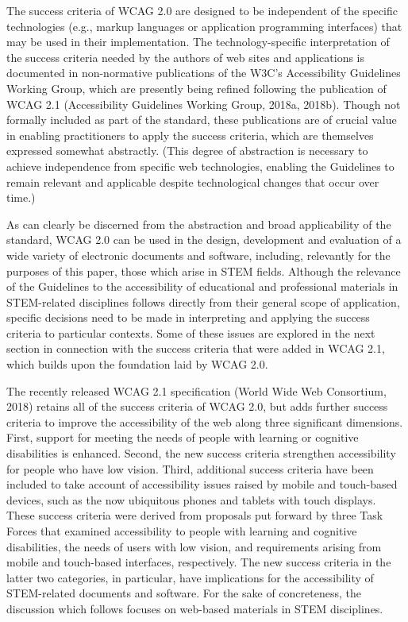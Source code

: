 \documentclass[11.5pt]{sig-alternate} %
\begin{document}
\begin{large}
The success criteria of WCAG 2.0 are designed to be independent of the specific technologies (e.g., markup languages or application programming interfaces) that may be used in their implementation. The technology-specific interpretation of the success criteria needed by the authors of web sites and applications is documented in non-normative publications of the W3C’s Accessibility Guidelines Working Group, which are presently being refined following the publication of WCAG 2.1 (Accessibility Guidelines Working Group, 2018a, 2018b). Though not formally included as part of the standard, these publications are of crucial value in enabling practitioners to apply the success criteria, which are themselves expressed somewhat abstractly. (This degree of abstraction is necessary to achieve independence from specific web technologies, enabling the Guidelines to remain relevant and applicable despite technological changes that occur over time.)

As can clearly be discerned from the abstraction and broad applicability of the standard, WCAG 2.0 can be used in the design, development and evaluation of a wide variety of electronic documents and software, including, relevantly for the purposes of this paper, those which arise in STEM fields. Although the relevance of the Guidelines to the accessibility of educational and professional materials in STEM-related disciplines follows directly from their general scope of application, specific decisions need to be made in interpreting and applying the success criteria to particular contexts. Some of these issues are explored in the next section in connection with the success criteria that were added in WCAG 2.1, which builds upon the foundation laid by WCAG 2.0.

The recently released WCAG 2.1 specification (World Wide Web Consortium, 2018) retains all of the success criteria of WCAG 2.0, but adds further success criteria to improve the accessibility of the web along three significant dimensions. First, support for meeting the needs of people with learning or cognitive disabilities is enhanced. Second, the new success criteria strengthen accessibility for people who have low vision. Third, additional success criteria have been included to take account of accessibility issues raised by mobile and touch-based devices, such as the now ubiquitous phones and tablets with touch displays. These success criteria were derived from proposals put forward by three Task Forces that examined accessibility to people with learning and cognitive disabilities, the needs of users with low vision, and requirements arising from mobile and touch-based interfaces, respectively. The new success criteria in the latter two categories, in particular, have implications for the accessibility of STEM-related documents and software. For the sake of concreteness, the discussion which follows focuses on web-based materials in STEM disciplines.


\end{large}
\end{document}
